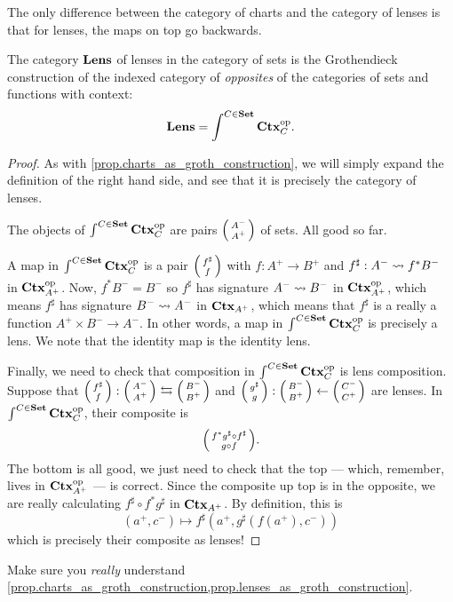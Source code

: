 \documentclass[DynamicalBook]{subfiles}
\begin{document}
  
The only difference between the category of charts and the category of lenses is
that for lenses, the maps on top go backwards.
\begin{proposition}\label{prop.lenses_as_groth_construction}
  The category $\textbf{Lens}$ of lenses in the category of sets is the
  Grothendieck construction of the indexed category of \emph{opposites} of the
  categories of sets and functions with context:
  $$\textbf{Lens} = \int^{C \in \textbf{Set}} \textbf{Ctx}_{C}^{\textnormal{op}}.$$
\end{proposition}
\begin{proof}
As with \cref{prop.charts_as_groth_construction}, we will simply expand the
definition of the right hand side, and see that it is precisely the category of lenses.

The objects of $\int^{C \in \textbf{Set}} \textbf{Ctx}_{C}^{\textnormal{op}}$ are pairs $\lens{A^-}{A^+}$ of
sets. All good so far.

A map in $\int^{C \in \textbf{Set}} \textbf{Ctx}_{C}^{\textnormal{op}}$ is a pair $\lens{f^{\sharp}}{f}$
with $f : A^+ \to B^+$ and $f^{\sharp} : A^- \rightsquigarrow f^{\ast} B^-$ in
$\textbf{Ctx}_{A^+}^{\textnormal{op}}$. Now, $f^{\ast}B^- = B^-$ so $f^{\sharp}$ has signature $A^-
\rightsquigarrow B^-$ in $\textbf{Ctx}_{A^+}^{\textnormal{op}}$, which means $f^{\sharp}$ has signature $B^-
\rightsquigarrow A^{-}$ in $\textbf{Ctx}_{A^+}$, which means that $f^{\sharp}$ is a really a
function $A^+ \times B^- \to A^{-}$. In other words, a map in $\int^{C \in \textbf{Set}}
\textbf{Ctx}_{C}^{\textnormal{op}}$ is precisely a lens. We note that the identity map is the identity lens.

Finally, we need to check that composition in $\int^{C \in \textbf{Set}} \textbf{Ctx}_{C}^{\textnormal{op}}$
is lens composition. Suppose that $\lens{f^{\sharp}}{f} :
  \lens{A^-}{A^+} \fromto \lens{B^-}{B^+}$ and $\lens{g^{\sharp}}{g} :
  \lens{B^-}{B^+} \from \lens{C^-}{C^+}$ are lenses. In $\int^{C \in \textbf{Set}}
  \textbf{Ctx}_{C}^{\textnormal{op}}$, their composite is
$$\lens{f^{\ast}g^{\sharp} \circ f^{\sharp}}{g \circ f}.$$
  The bottom is all good, we just need to check that the top --- which,
  remember, lives in $\textbf{Ctx}_{A^+}^{\textnormal{op}}$ --- is correct. Since the composite up top
  is in
  the opposite, we are really calculating $f^{\sharp} \circ f^{\ast} g^{\sharp}$
  in $\textbf{Ctx}_{A^+}$. By definition, this is
$$(a^+, c^-) \mapsto f^{\sharp}(a^+, g^{\sharp}(f(a^+), c^-))$$
which is precisely their composite as lenses!
\end{proof}

\begin{exercise}\label{ex.really_understand_charts_as_groth_construction}
  Make sure you \emph{really} understand \cref{prop.charts_as_groth_construction,prop.lenses_as_groth_construction}.
\end{exercise}
\end{document}
